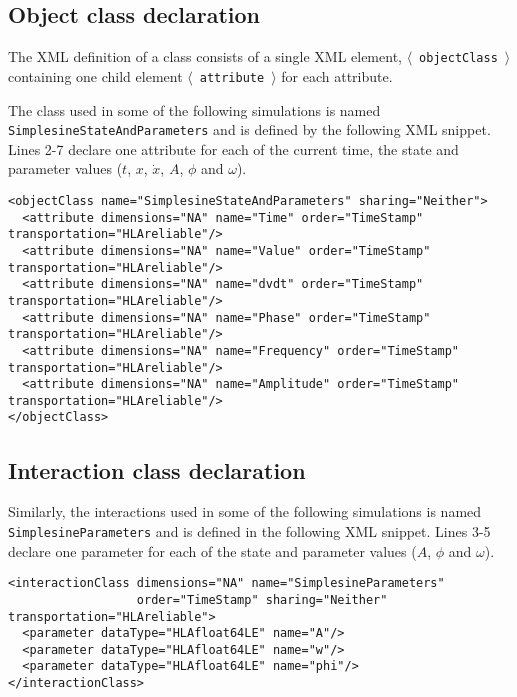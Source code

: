 \subsection{Object class declaration}

The XML definition of a class consists of a single XML element,
$\langle$~{\tt objectClass}~$\rangle$
containing one child element
$\langle$~{\tt attribute}~$\rangle$
for each attribute.

The class used in some of the following simulations is named
{\tt SimplesineStateAndParameters} and is defined by the following XML snippet.
Lines 2-7 declare one attribute for each of
the current time, the state and parameter values
($t$, $x$, $\dot{x}$, $A$, $\phi$ and $\omega$).

\begin{lstlisting}[caption={FOM snippet defining a class},label={list:FOM-snippet-class}]
<objectClass name="SimplesineStateAndParameters" sharing="Neither">
  <attribute dimensions="NA" name="Time" order="TimeStamp" transportation="HLAreliable"/>
  <attribute dimensions="NA" name="Value" order="TimeStamp" transportation="HLAreliable"/>
  <attribute dimensions="NA" name="dvdt" order="TimeStamp" transportation="HLAreliable"/>
  <attribute dimensions="NA" name="Phase" order="TimeStamp" transportation="HLAreliable"/>
  <attribute dimensions="NA" name="Frequency" order="TimeStamp" transportation="HLAreliable"/>
  <attribute dimensions="NA" name="Amplitude" order="TimeStamp" transportation="HLAreliable"/>
</objectClass>
\end{lstlisting}

\subsection{Interaction class declaration}

Similarly, the interactions used in some of the following simulations
is named {\tt SimplesineParameters} and is defined in the following XML
snippet.
Lines 3-5 declare one parameter for each of the state and parameter values
($A$, $\phi$ and $\omega$).

\begin{lstlisting}[caption={FOM snippet defining a interaction},label={list:FOM-snippet-interaction}]
<interactionClass dimensions="NA" name="SimplesineParameters"
                  order="TimeStamp" sharing="Neither" transportation="HLAreliable">
  <parameter dataType="HLAfloat64LE" name="A"/>
  <parameter dataType="HLAfloat64LE" name="w"/>
  <parameter dataType="HLAfloat64LE" name="phi"/>
</interactionClass>
\end{lstlisting}


